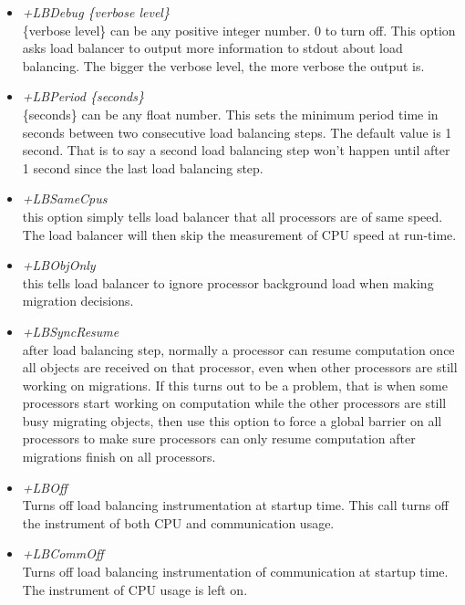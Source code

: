 \begin{enumerate}
\begin{itemize}
\item {\em +LBDebug \{verbose level\}} \\
     \{verbose level\} can be any positive integer number. 0 to turn off. 
     This option asks load balancer to output more information to stdout 
about load balancing. The bigger the verbose level, the more verbose the output is.
\item {\em +LBPeriod \{seconds\}} \\
     \{seconds\} can be any float number. This sets the minimum period time in 
seconds between two consecutive load balancing steps. The default value is 
1 second. That is to say a second load balancing step won't happen until
after 1 second since the last load balancing step.
\item {\em +LBSameCpus} \\
     this option simply tells load balancer that all processors are of same speed. The load balancer will then skip the measurement of CPU speed at run-time.
\item {\em +LBObjOnly} \\
     this tells load balancer to ignore processor background load when making migration decisions.
\item {\em +LBSyncResume} \\
     after load balancing step, normally a processor can resume computation 
once all objects are received on that processor, even when other processors
are still working on migrations.  If this turns out to be a problem, 
that is when some processors start working on computation while the other 
processors are still busy migrating objects, then use this option to force 
a global barrier on all processors to make sure processors can only resume 
computation after migrations finish on all processors.
\item {\em +LBOff} \\
     Turns off load balancing instrumentation at startup time. This call turns
off the instrument of both CPU and communication usage.
\item {\em +LBCommOff} \\
     Turns off load balancing instrumentation of communication at startup time. 
The instrument of CPU usage is left on.
\end{itemize}

\end{enumerate}


